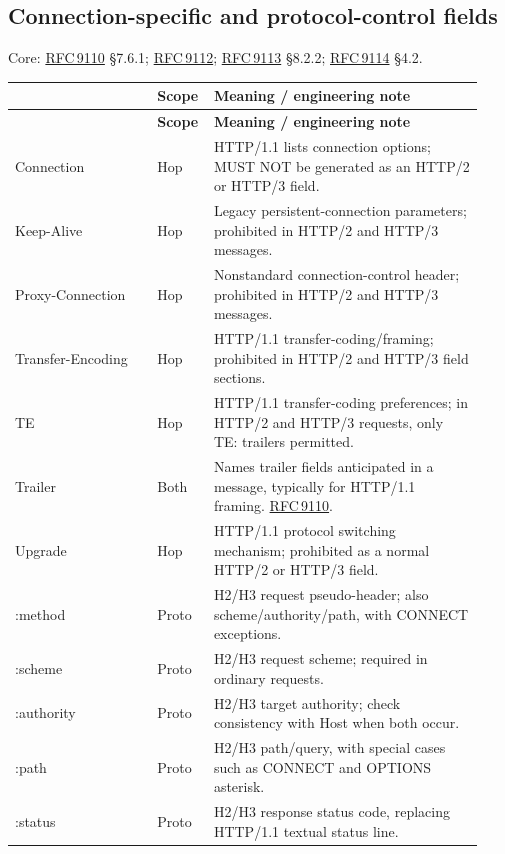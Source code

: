 \documentclass[10pt,letterpaper,oneside]{article}
\newcommand{\rf}[1]{\href{https://www.rfc-editor.org/rfc/rfc#1.html}{RFC\,#1}}
\newcommand{\cataloghead}{\toprule\rowcolor{Navy}\multicolumn{1}{>{\columncolor{Navy}}p{0.291\linewidth}}{\color{white}\sffamily\bfseries Field} & \color{white}\sffamily\bfseries Scope & \color{white}\sffamily\bfseries Meaning / engineering note \\ \midrule}
\newcommand{\catalogstart}{\begingroup\footnotesize\setlength{\LTpre}{0.15em}\setlength{\LTpost}{0.6em}\begin{longtable}{>{\RaggedRight\arraybackslash}p{0.291\linewidth}>{\RaggedRight\arraybackslash}p{0.085\linewidth}>{\RaggedRight\arraybackslash}p{0.555\linewidth}}\cataloghead\endfirsthead\cataloghead\endhead}
\newcommand{\catalogend}{\bottomrule\end{longtable}\endgroup}
\begin{document}
\subsection{Connection-specific and protocol-control fields}
\begin{tipbox}\footnotesize Core: \rf{9110} §7.6.1; \rf{9112}; \rf{9113} §8.2.2; \rf{9114} §4.2.\end{tipbox}
\catalogstart
{\ttfamily\color{Deep}Connection} & {\sffamily\scriptsize\color{Muted}Hop} & HTTP/1.1 lists connection options; MUST NOT be generated as an HTTP/2 or HTTP/3 field. \\ \midrule
{\ttfamily\color{Deep}Keep-\allowbreak{}Alive} & {\sffamily\scriptsize\color{Muted}Hop} & Legacy persistent-connection parameters; prohibited in HTTP/2 and HTTP/3 messages. \\ \midrule
{\ttfamily\color{Deep}Proxy-\allowbreak{}Connection} & {\sffamily\scriptsize\color{Muted}Hop} & Nonstandard connection-control header; prohibited in HTTP/2 and HTTP/3 messages. \\ \midrule
{\ttfamily\color{Deep}Transfer-\allowbreak{}Encoding} & {\sffamily\scriptsize\color{Muted}Hop} & HTTP/1.1 transfer-coding/framing; prohibited in HTTP/2 and HTTP/3 field sections. \\ \midrule
{\ttfamily\color{Deep}TE} & {\sffamily\scriptsize\color{Muted}Hop} & HTTP/1.1 transfer-coding preferences; in HTTP/2 and HTTP/3 requests, only TE: trailers permitted. \\ \midrule
{\ttfamily\color{Deep}Trailer} & {\sffamily\scriptsize\color{Muted}Both} & Names trailer fields anticipated in a message, typically for HTTP/1.1 framing. \rf{9110}. \\ \midrule
{\ttfamily\color{Deep}Upgrade} & {\sffamily\scriptsize\color{Muted}Hop} & HTTP/1.1 protocol switching mechanism; prohibited as a normal HTTP/2 or HTTP/3 field. \\ \midrule
{\ttfamily\color{Deep}:method} & {\sffamily\scriptsize\color{Muted}Proto} & H2/H3 request pseudo-header; also scheme/authority/path, with CONNECT exceptions. \\ \midrule
{\ttfamily\color{Deep}:scheme} & {\sffamily\scriptsize\color{Muted}Proto} & H2/H3 request scheme; required in ordinary requests. \\ \midrule
{\ttfamily\color{Deep}:authority} & {\sffamily\scriptsize\color{Muted}Proto} & H2/H3 target authority; check consistency with Host when both occur. \\ \midrule
{\ttfamily\color{Deep}:path} & {\sffamily\scriptsize\color{Muted}Proto} & H2/H3 path/query, with special cases such as CONNECT and OPTIONS asterisk. \\ \midrule
{\ttfamily\color{Deep}:status} & {\sffamily\scriptsize\color{Muted}Proto} & H2/H3 response status code, replacing HTTP/1.1 textual status line. \\ \midrule
\catalogend
\end{document}
